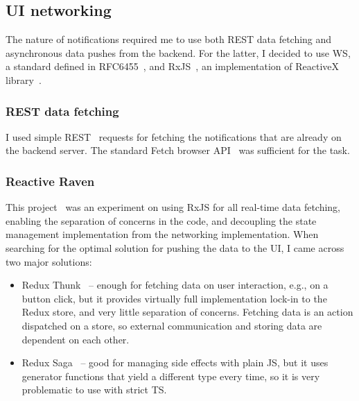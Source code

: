 \subsection{UI networking}\label{sec:ui-networking}

The nature of notifications required me to use
both \ac{REST} data fetching and asynchronous data pushes from the backend.
For the latter, I decided to use \ac{WS},
a standard defined in RFC6455~\cite{fette_rfc6455_2011}, and
RxJS~\cite{lesh_rxjs_2022}, an implementation of
ReactiveX library~\cite{gross_reactivex_2021}.

\subsubsection{REST data fetching}\label{sec:rest-data-fetching}

I used simple \ac{RES}T~\cite{perrier_rest_2022} requests
for fetching the notifications
that are already on the backend server.
The standard Fetch browser \ac{API}~\cite{perrier_fetch_2022}
was sufficient for the task.

\subsubsection{Reactive Raven}\label{sec:reactive-raven}

This project~\cite{sewera_reactive_2022} was an experiment
on using RxJS for all real-time data fetching,
enabling the separation of concerns in the code,
and decoupling the state management implementation
from the networking implementation.
When searching for the optimal solution
for pushing the data to the \ac{UI},
I came across two major solutions:

\begin{itemize}
      \item
            Redux Thunk~\cite{gaeraon_redux_2022-1} --
            enough for fetching data on user interaction,
            e.g., on a button click,
            but it provides virtually full implementation lock-in
            to the Redux store, and very little separation of concerns.
            Fetching data is an action dispatched on a store,
            so external communication and storing data are dependent on each other.
      \item
            Redux Saga~\cite{elouafi_redux_2022} --
            good for managing side effects with plain \ac{JS},
            but it uses generator functions
            that yield a different type every time,
            so it is very problematic to use with strict \ac{TS}.
\end{itemize}

